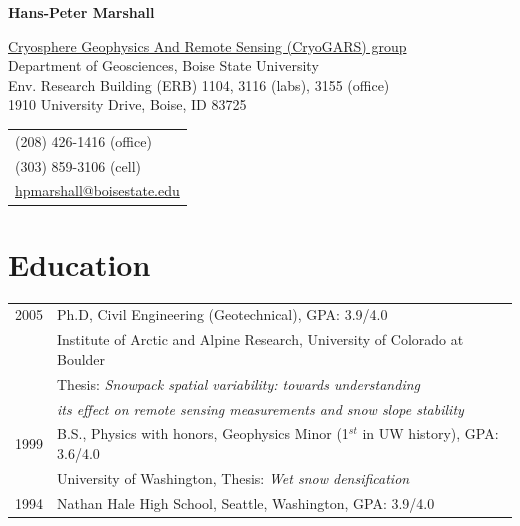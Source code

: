 \documentclass[11pt]{article}
\def\name{Hans-Peter Marshall}
\begin{document}


\centerline{\Large \bf \name}

\vspace{0.25in}

\begin{minipage}{0.70\linewidth}
  \href{https://www.cryogars.com}{Cryosphere Geophysics And Remote Sensing (CryoGARS) group} \\
  Department of Geosciences, Boise State University \\
  Env. Research Building (ERB) 1104, 3116 (labs), 3155 (office) \\
  1910 University Drive, Boise, ID  83725 \\
\end{minipage}
\begin{minipage}{0.30\linewidth}
  \begin{tabular}{l}
     (208) 426-1416 (office) \\
     (303) 859-3106 (cell) \\
    \href{mailto:hpmarshall@boisestate.edu}{hpmarshall@boisestate.edu} \\
  \end{tabular}
\end{minipage}

\vspace{-0.3cm}

\section*{Education}

\begin{tabular}{ll}
	2005 & Ph.D, Civil Engineering (Geotechnical), GPA: 3.9/4.0 \\
	          & Institute of Arctic and Alpine Research, University of Colorado at Boulder \\
		 & Thesis: \textit{Snowpack spatial variability: towards understanding} \\
                  &   \textit{its effect on remote sensing measurements and snow slope stability} \\
	1999 &  B.S., Physics with honors, Geophysics Minor (1$^{st}$ in UW history), GPA: 3.6/4.0 \\
	         &   University of Washington, Thesis: \textit{Wet snow densification} \\
       1994  &  Nathan Hale High School, Seattle, Washington, GPA: 3.9/4.0 \\
\end{tabular}
\end{document}
